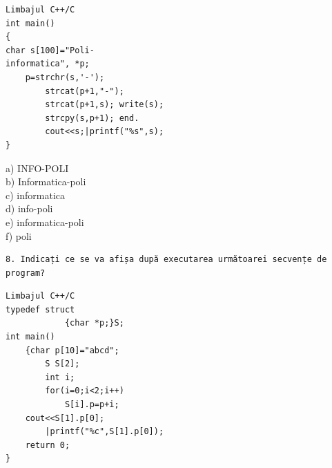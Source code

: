 \documentclass[10pt]{article}
\begin{document}
\begin{verbatim}
Limbajul C++/C
int main()
{
char s[100]="Poli-
informatica", *p;
    p=strchr(s,'-');
        strcat(p+1,"-");
        strcat(p+1,s); write(s);
        strcpy(s,p+1); end.
        cout<<s;|printf("%s",s);
}
\end{verbatim}

a) INFO-POLI\\
b) Informatica-poli\\
c) informatica\\
d) info-poli\\
e) informatica-poli\\
f) poli

\begin{verbatim}
8. Indicați ce se va afișa după executarea următoarei secvențe de program?
\end{verbatim}

\begin{verbatim}
Limbajul C++/C
typedef struct
            {char *p;}S;
int main()
    {char p[10]="abcd";
        S S[2];
        int i;
        for(i=0;i<2;i++)
            S[i].p=p+i;
    cout<<S[1].p[0];
        |printf("%c",S[1].p[0]);
    return 0;
}
\end{verbatim}
\end{document}
